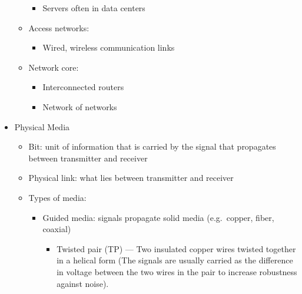 \begin{itemize}
\begin{itemize}
\begin{itemize}
          \item Servers often in data centers

        \end{itemize}

      \item Access networks:

        \begin{itemize}

          \item Wired, wireless communication links

        \end{itemize}

      \item Network core:

        \begin{itemize}

          \item Interconnected routers

          \item Network of networks

        \end{itemize}

    \end{itemize}

  \item Physical Media

    \begin{itemize}

      \item Bit: unit of information that is carried by the signal that propagates between transmitter and receiver

      \item Physical link: what lies between transmitter and receiver

      \item Types of media:

        \begin{itemize}

          \item Guided media: signals propagate solid media (e.g.\ copper, fiber, coaxial)

            \begin{itemize}

              \item Twisted pair (TP) — Two insulated copper wires twisted together in a helical form (The signals are usually carried as the difference in voltage between the two wires in the pair to increase robustness against noise).


\end{itemize}
\end{itemize}
\end{itemize}
\end{itemize}
